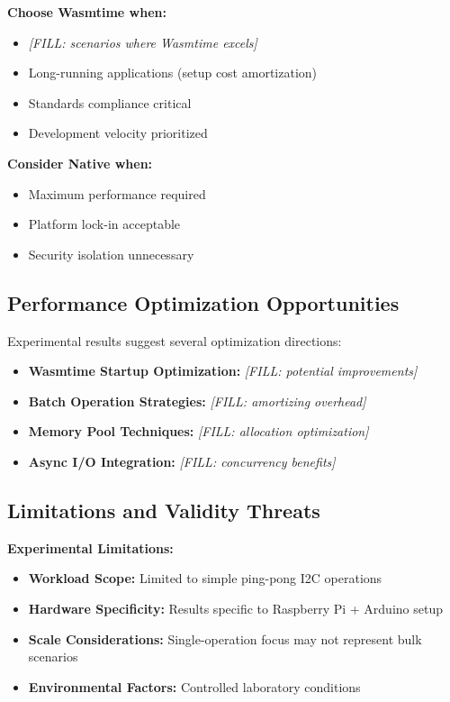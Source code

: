 \textbf{Choose Wasmtime when:}
\begin{itemize}
    \item \textit{[FILL: scenarios where Wasmtime excels]}
    \item Long-running applications (setup cost amortization)
    \item Standards compliance critical
    \item Development velocity prioritized
\end{itemize}

\textbf{Consider Native when:}
\begin{itemize}
    \item Maximum performance required
    \item Platform lock-in acceptable
    \item Security isolation unnecessary
\end{itemize}

\subsection{Performance Optimization Opportunities}
\label{subsec:optimization-opportunities}

Experimental results suggest several optimization directions:

\begin{itemize}
    \item \textbf{Wasmtime Startup Optimization:} \textit{[FILL: potential improvements]}
    \item \textbf{Batch Operation Strategies:} \textit{[FILL: amortizing overhead]}
    \item \textbf{Memory Pool Techniques:} \textit{[FILL: allocation optimization]}
    \item \textbf{Async I/O Integration:} \textit{[FILL: concurrency benefits]}
\end{itemize}

\subsection{Limitations and Validity Threats}
\label{subsec:limitations}

\textbf{Experimental Limitations:}
\begin{itemize}
    \item \textbf{Workload Scope:} Limited to simple ping-pong I2C operations
    \item \textbf{Hardware Specificity:} Results specific to Raspberry Pi + Arduino setup
    \item \textbf{Scale Considerations:} Single-operation focus may not represent bulk scenarios
    \item \textbf{Environmental Factors:} Controlled laboratory conditions
\end{itemize}

